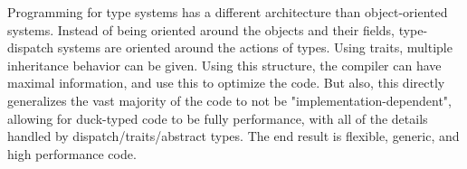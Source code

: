 \documentclass[11pt]{article}
\begin{document}
Programming for type systems has a different architecture than
object-oriented systems. Instead of being oriented around the objects
and their fields, type-dispatch systems are oriented around the actions
of types. Using traits, multiple inheritance behavior can be given.
Using this structure, the compiler can have maximal information, and use
this to optimize the code. But also, this directly generalizes the vast
majority of the code to not be "implementation-dependent", allowing for
duck-typed code to be fully performance, with all of the details handled
by dispatch/traits/abstract types. The end result is flexible, generic,
and high performance code.


    
    
    
    
\end{document}
